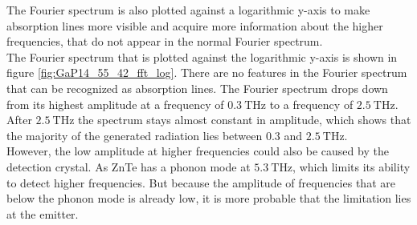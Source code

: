 The Fourier spectrum is also plotted against a logarithmic y-axis to make absorption lines more visible and acquire more information about the higher frequencies, that do not appear in the normal Fourier spectrum.
\\
The Fourier spectrum that is plotted against the logarithmic y-axis is shown in figure \ref{fig:GaP14_55_42_fft_log}.
There are no features in the Fourier spectrum that can be recognized as absorption lines.
The Fourier spectrum drops down from its highest amplitude at a frequency of $\SI{0.3}{\tera\hertz}$ to a frequency of $\SI{2.5}{\tera\hertz}$.
After $\SI{2.5}{\tera\hertz}$ the spectrum stays almost constant in amplitude, which shows that the majority of the generated radiation lies between $0.3$ and $\SI{2.5}{\tera\hertz}$.
\\
However, the low amplitude at higher frequencies could also be caused by the detection crystal.
As ZnTe has a phonon mode at $\SI{5.3}{\tera\hertz}$\cite{phonon_modes,phonon_ZnTe}, which limits its ability to detect higher frequencies.
But because the amplitude of frequencies that are below the phonon mode is already low, it is more probable that the limitation lies at the emitter.
